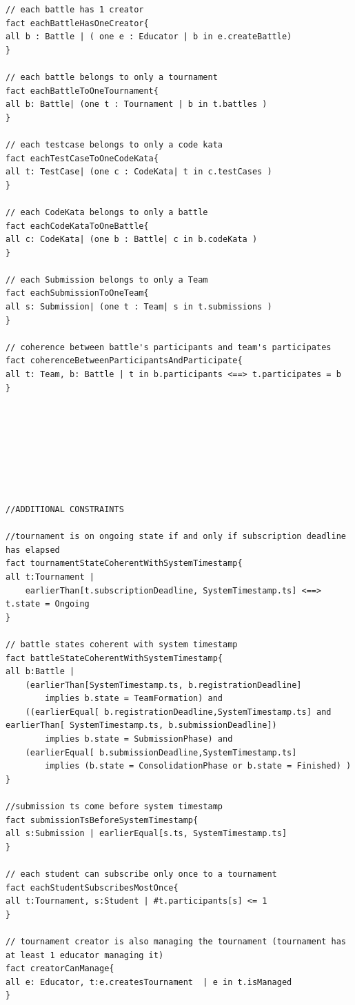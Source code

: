 \begin{lstlisting}[language=alloy]
// each battle has 1 creator
fact eachBattleHasOneCreator{
all b : Battle | ( one e : Educator | b in e.createBattle)
}

// each battle belongs to only a tournament
fact eachBattleToOneTournament{
all b: Battle| (one t : Tournament | b in t.battles )
}

// each testcase belongs to only a code kata
fact eachTestCaseToOneCodeKata{
all t: TestCase| (one c : CodeKata| t in c.testCases )
}

// each CodeKata belongs to only a battle
fact eachCodeKataToOneBattle{
all c: CodeKata| (one b : Battle| c in b.codeKata )
}

// each Submission belongs to only a Team
fact eachSubmissionToOneTeam{
all s: Submission| (one t : Team| s in t.submissions )
}

// coherence between battle's participants and team's participates
fact coherenceBetweenParticipantsAndParticipate{
all t: Team, b: Battle | t in b.participants <==> t.participates = b
}








//ADDITIONAL CONSTRAINTS

//tournament is on ongoing state if and only if subscription deadline has elapsed
fact tournamentStateCoherentWithSystemTimestamp{
all t:Tournament | 
    earlierThan[t.subscriptionDeadline, SystemTimestamp.ts] <==> t.state = Ongoing
}

// battle states coherent with system timestamp
fact battleStateCoherentWithSystemTimestamp{
all b:Battle | 
    (earlierThan[SystemTimestamp.ts, b.registrationDeadline] 
        implies b.state = TeamFormation) and
    ((earlierEqual[ b.registrationDeadline,SystemTimestamp.ts] and earlierThan[ SystemTimestamp.ts, b.submissionDeadline]) 
        implies b.state = SubmissionPhase) and
    (earlierEqual[ b.submissionDeadline,SystemTimestamp.ts] 
        implies (b.state = ConsolidationPhase or b.state = Finished) )
}

//submission ts come before system timestamp
fact submissionTsBeforeSystemTimestamp{
all s:Submission | earlierEqual[s.ts, SystemTimestamp.ts]
}

// each student can subscribe only once to a tournament
fact eachStudentSubscribesMostOnce{
all t:Tournament, s:Student | #t.participants[s] <= 1
}

// tournament creator is also managing the tournament (tournament has at least 1 educator managing it)
fact creatorCanManage{ 
all e: Educator, t:e.createsTournament  | e in t.isManaged 
}


\end{lstlisting}
